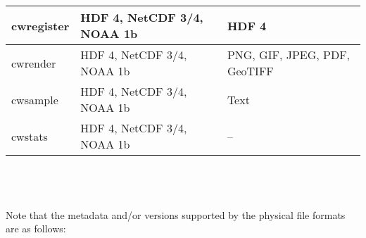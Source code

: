\begin{tabular}{|l|p{5cm}|p{5cm}|}
  cwregister & HDF 4, NetCDF 3/4, NOAA 1b & HDF 4 \\ \hline




  cwrender & HDF 4, NetCDF 3/4, NOAA 1b & PNG, GIF, JPEG, PDF,
  GeoTIFF \\ \hline

  cwsample & HDF 4, NetCDF 3/4, NOAA 1b & Text \\ \hline

  cwstats & HDF 4, NetCDF 3/4, NOAA 1b & -- \\ \hline


\end{tabular} \\
\\
\\
Note that the metadata and/or versions supported by the physical file formats
are as follows: \\
\\
